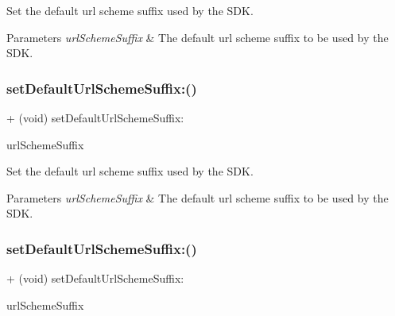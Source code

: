 Set the default url scheme suffix used by the S\+DK.


\begin{DoxyParams}{Parameters}
{\em url\+Scheme\+Suffix} & The default url scheme suffix to be used by the S\+DK. \\
\hline
\end{DoxyParams}
\mbox{\label{interfaceFBSettings_a08a9504a71c1c9ec329e97da7c636337}} 
\subsubsection{\texorpdfstring{set\+Default\+Url\+Scheme\+Suffix\+:()}{setDefaultUrlSchemeSuffix:()}\hspace{0.1cm}{\footnotesize\ttfamily [3/5]}}
{\footnotesize\ttfamily + (void) set\+Default\+Url\+Scheme\+Suffix\+: \begin{DoxyParamCaption}\item[{(N\+S\+String $\ast$)}]{url\+Scheme\+Suffix }\end{DoxyParamCaption}}

Set the default url scheme suffix used by the S\+DK.


\begin{DoxyParams}{Parameters}
{\em url\+Scheme\+Suffix} & The default url scheme suffix to be used by the S\+DK. \\
\hline
\end{DoxyParams}
\mbox{\label{interfaceFBSettings_a08a9504a71c1c9ec329e97da7c636337}} 
\subsubsection{\texorpdfstring{set\+Default\+Url\+Scheme\+Suffix\+:()}{setDefaultUrlSchemeSuffix:()}\hspace{0.1cm}{\footnotesize\ttfamily [4/5]}}
{\footnotesize\ttfamily + (void) set\+Default\+Url\+Scheme\+Suffix\+: \begin{DoxyParamCaption}\item[{(N\+S\+String $\ast$)}]{url\+Scheme\+Suffix }\end{DoxyParamCaption}}

